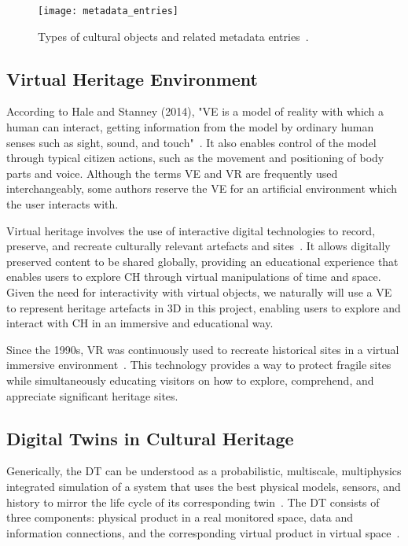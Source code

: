 \begin{figure}[h!]
    \centering
    \texttt{[image: metadata\_entries]}
    \caption{Types of cultural objects and related metadata entries~\cite{Windhager2019Visualization}.}
    \label{fig:ch_objects}
\end{figure}
\FloatBarrier


\subsection{Virtual Heritage Environment}
\label{sec:virtual_heritage}

According to Hale and Stanney (2014), "\gls{VE} is a model of reality with which a human can interact, getting information 
from the model by ordinary human senses such as sight, sound, and touch"~\cite{hale2014handbook}. 
It also enables control of the model through typical citizen actions, such as the movement and positioning of body parts and voice. 
Although the terms \gls{VE} and \gls{VR} are frequently used interchangeably, some authors reserve the \gls{VE} for an artificial environment which the user interacts with.

Virtual heritage involves the use of interactive digital technologies to record, preserve, and recreate 
culturally relevant artefacts and sites~\cite{848434}. It allows digitally preserved content to be shared globally, providing an educational experience that enables users to explore \gls{CH} through virtual manipulations of time and space. 
Given the need for interactivity with virtual objects, we naturally will use a \gls{VE} to represent heritage artefacts 
in \gls{3D} in this project, enabling users to explore and interact with \gls{CH} in an immersive and educational way.

Since the 1990s, \gls{VR} was continuously used to recreate historical sites in a virtual immersive environment~\cite{hale2014handbook}. 
This technology provides a way to protect fragile sites while simultaneously educating visitors on how to explore, comprehend, and appreciate significant heritage sites.

\subsection{Digital Twins in Cultural Heritage}
\label{sec:digital_twin}


Generically, the \gls{DT} can be understood as a probabilistic, multiscale,
multiphysics integrated simulation of a system that uses the best physical models,
sensors, and history to mirror the life cycle of its corresponding twin~\cite{dezen2020towards}.
The \gls{DT} consists of three components: physical product in a real monitored
space, data and information connections, and the corresponding virtual product
in virtual space~\cite{grieves2017digital}.


